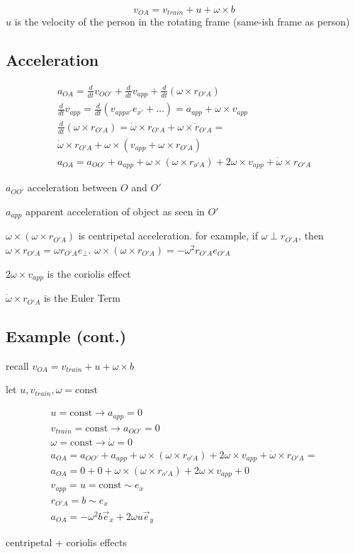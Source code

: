 \documentclass[fleqn]{report}
\newcommand{\const}{\textrm{const}}
\newcommand{\equations} [1] {
\begin{gather*}
#1
\end{gather*}
}
\begin{document}
\[
v_{O A} = v_{train} + u + \omega \times b
\]
$u$ is the velocity of the person in the rotating frame (same-ish frame as person)

\subsection{Acceleration}

\equations{
    a_{O A} = \frac{d}{dt} v_{O O'} + \frac{d}{dt} v_{app} 
    + \frac{d}{dt} (\omega \times r_{O' A})
    \\
    \frac{d}{dt} v_{app} = 
    \frac{d}{dt} ( v_{app x'} e_{x'} + \ldots ) 
    =
    a_{app} + \omega \times v_{app}
    \\
    \frac{d}{dt} (\omega \times r_{O' A})
    =
    \dot \omega \times r_{O' A} + \omega \times \dot r_{O' A}
    =
    \\
    \dot \omega \times r_{O' A} + 
    \omega \times (v_{app} + \omega \times r_{O' A})
    \\
    a_{O A} = 
    a_{O O'} + a_{app} + \omega \times (\omega \times r_{o' A})
    + 2 \omega \times v_{app} + \dot \omega \times r_{O' A}
}

$a_{O O'}$ acceleration between $O$ and $O'$

$a_{app}$ apparent acceleration of object as seen in $O'$

$\omega \times (\omega \times r_{O' A})$ is centripetal acceleration. 
for example, if $\omega \perp r_{O' A}$, then $\omega \times r_{O' A} = \omega r_{O' A} e_{\perp}$.
$\omega \times (\omega \times r_{O' A}) = - \omega^2 r_{O' A} e_{O' A}$

$2 \omega \times v_{app}$ is the coriolis effect 

$\dot \omega \times r_{O' A}$ is the Euler Term 


\subsection{Example (cont.)}
recall $v_{O A} = v_{train} + u + \omega \times b$

let $u, v_{train}, \omega = \const$

\equations{
    u = \const \rightarrow a_{app} = 0
    \\
    v_{train} = \const \rightarrow a_{O O'} = 0
    \\
    \omega = \const \rightarrow \dot \omega = 0
    \\
    a_{O A} = 
    a_{O O'} + a_{app} + \omega \times (\omega \times r_{o' A})
    + 2 \omega \times v_{app} + \dot \omega \times r_{O' A}
    =
    \\
    a_{O A} = 
    0 + 0 + \omega \times (\omega \times r_{o' A})
    + 2 \omega \times v_{app} + 0
    \\
    v_{app} = u = \const \sim e_x
    \\
    r_{O' A} = b \sim e_x
    \\
    a_{O A} = - \omega^2 b \vec e_x + 2 \omega u \vec e_y
}
centripetal + coriolis effects 
\end{document}
